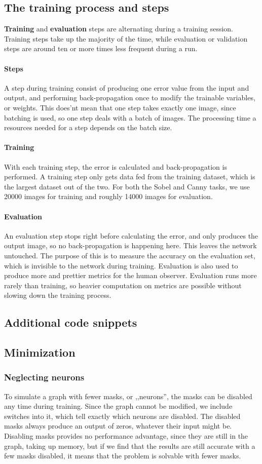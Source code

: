 \documentclass[a4paper,12pt]{article}
\begin{document}
\subsection{The training process and steps}
\textbf{Training} and \textbf{evaluation} steps are alternating during a training session. Training steps take up the majority of the time, while evaluation or validation steps are around ten or more times less frequent during a run.
\paragraph{Steps}
A step during training consist of producing one error value from the input and output, and performing back-propagation once to modify the trainable variables, or weights. This does'nt mean that one step takes exactly one image, since batching is used, so one step deals with a batch of images. The processing time a resources needed for a step depends on the batch size.
\paragraph{Training}
With each training step, the error is calculated and back-propagation is performed. A training step only gets data fed from the training dataset, which is the largest dataset out of the two. For both the Sobel and Canny tasks, we use 20000 images for training and roughly 14000 images for evaluation.
\paragraph{Evaluation}
An evaluation step stops right before calculating the error, and only produces the output image, so no back-propagation is happening here. This leaves the network untouched. The purpose of this is to measure the accuracy on the evaluation set, which is invisible to the network during training. Evaluation is also used to produce more and prettier metrics for the human observer. Evaluation runs more rarely than training, so heavier computation on metrics are possible without slowing down the training process.
\subsection{Additional code snippets}
\subsection{Minimization}
\subsubsection{Neglecting neurons}
To simulate a graph with fewer masks, or ,,neurons'', the masks can be disabled any time during training. Since the graph cannot be modified, we include switches into it, which tell exactly which neurons are disabled. The disabled masks always produce an output of zeros, whatever their input might be. Disabling masks provides no performance advantage, since they are still in the graph, taking up memory, but if we find that the results are still accurate with a few masks disabled, it means that the problem is solvable with fewer masks.
\end{document}
